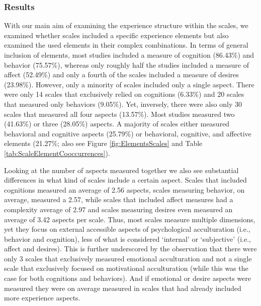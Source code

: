 \subsubsection{Results}

With our main aim of examining the experience structure within the
scales, we examined whether scales included a specific experience
elements but also examined the used elements in their complex
combinations. In terms of general inclusion of elements, most studies
included a measure of cognition (86.43\%) and behavior (75.57\%),
whereas only roughly half the studies included a measure of affect
(52.49\%) and only a fourth of the scales included a measure of desires
(23.98\%). However, only a minority of scales included only a single
aspect. There were only 14 scales that exclusively relied on cognitions
(6.33\%) and 20 scales that measured only behaviors (9.05\%). Yet,
inversely, there were also only 30 scales that measured all four aspects
(13.57\%). Most studies measured two (41.63\%) or three (28.05\%)
aspects. A majority of scales either measured behavioral and cognitive
aspects (25.79\%) or behavioral, cognitive, and affective elements
(21.27\%; also see Figure \ref{fig:ElementsScales} and Table
\ref{tab:ScaleElementCooccurrences}).

Looking at the number of aspects measured together we also see
substantial differences in what kind of scales include a certain aspect.
Scales that included cognitions measured an average of 2.56 aspects,
scales measuring behavior, on average, measured a 2.57, while scales
that included affect measures had a complexity average of 2.97 and
scales measuring desires even measured an average of 3.42 aspects per
scale. Thus, most scales measure multiple dimensions, yet they focus on
external accessible aspects of psychological acculturation (i.e.,
behavior and cognition), less of what is considered `internal' or
`subjective' (i.e., affect and desires). This is further underscored by
the observation that there were only 3 scales that exclusively measured
emotional acculturation and not a single scale that exclusively focused
on motivational acculturation (while this was the case for both
cognitions and behaviors). And if emotional or desire aspects were
measured they were on average measured in scales that had already
included more experience aspects.

